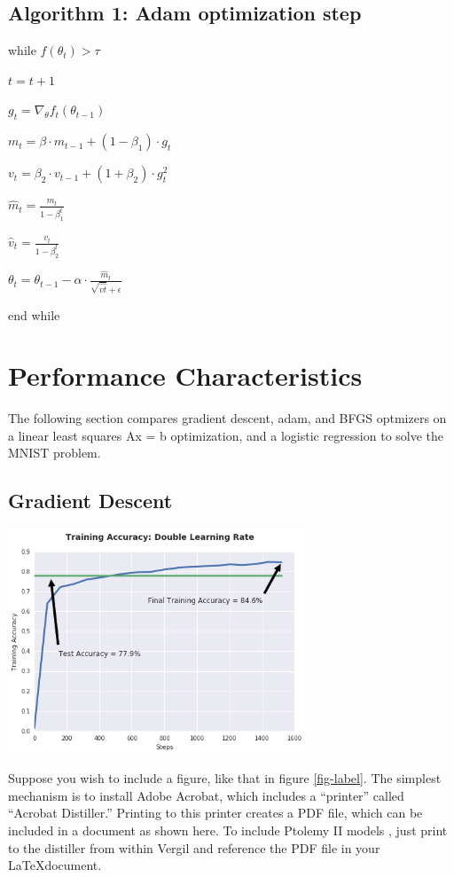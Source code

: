 \documentclass[10pt,twocolumn]{article}
\begin{document}
\subsection{Algorithm 1: Adam optimization step}

 while  $ f ( \theta_t ) > \tau $ 

	$ t = t + 1 $

	$g_t = \nabla_{\theta} f_t (\theta_{t-1})$

	$ m_t = \beta \cdot m_{t-1} + (1-\beta_1) \cdot g_t  $

	$ v_t = \beta_2 \cdot v_{t-1} + (1+\beta_2) \cdot g_t^2  $

	$\hat{m}_t =\frac{m_t}{1-\beta_1^t}  $

	$\hat{v}_t = \frac{v_t}{1-\beta_2^t}  $

	
	$ \theta_t = \theta_{t-1} - \alpha \cdot  \frac{{\hat{m}_t}}{\sqrt{\hat{vt}} + \epsilon} $


end while



\section{Performance Characteristics}

The following section compares gradient descent, adam, and BFGS optmizers on a linear least squares Ax = b optimization, and a logistic regression to solve the MNIST problem.

\subsection{Gradient Descent}


    \includegraphics[width=3.5in]{plot1-GradDescent.png}



Suppose you wish to include a figure, like that in figure \ref{fig-label}.
The simplest mechanism is to install Adobe Acrobat, which includes
a ``printer'' called ``Acrobat Distiller.'' Printing to this printer
creates a PDF file, which can be included in a document as shown
here.  To include Ptolemy II models \cite{PtolemyVol1:04},
just print to the distiller from within Vergil and reference
the PDF file in your \LaTeX document.
\end{document}
